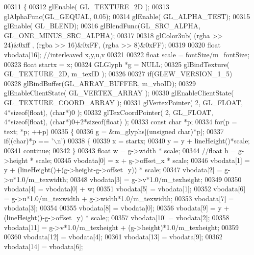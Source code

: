 \begin{DoxyCode}
00311 \{
00312     glEnable( GL_TEXTURE_2D );
00313     glAlphaFunc(GL_GEQUAL, 0.05);
00314     glEnable( GL_ALPHA_TEST);
00315     glEnable( GL_BLEND);
00316     glBlendFunc(GL_SRC_ALPHA, GL_ONE_MINUS_SRC_ALPHA);
00317 
00318     glColor3ub( (rgba >> 24)&0xff , (rgba >> 16)&0xFF, (rgba >> 8)&0xFF);
00319 
00320     \textcolor{keywordtype}{float} vbodata[16]; \textcolor{comment}{//interleaved x,y,u,v}
00321 
00322     \textcolor{keywordtype}{float} scale = fontSize/m_fontSize;
00323     \textcolor{keywordtype}{float} startx = x;
00324     GLGlyph *g = NULL;
00325     glBindTexture( GL_TEXTURE_2D, m_texID );
00326 
00327     \textcolor{keywordflow}{if}(GLEW_VERSION_1_5)
00328         glBindBuffer(GL_ARRAY_BUFFER, m_vboID);
00329     glEnableClientState( GL_VERTEX_ARRAY );
00330     glEnableClientState( GL_TEXTURE_COORD_ARRAY );
00331     glVertexPointer( 2, GL_FLOAT, 4*\textcolor{keyword}{sizeof}(\textcolor{keywordtype}{float}), (\textcolor{keywordtype}{char}*)0 );
00332     glTexCoordPointer( 2, GL_FLOAT, 4*\textcolor{keyword}{sizeof}(\textcolor{keywordtype}{float}), (\textcolor{keywordtype}{char}*)0+2*\textcolor{keyword}{sizeof}(\textcolor{keywordtype}{float}) );
00333     \textcolor{keyword}{const} \textcolor{keywordtype}{char} *p;
00334     \textcolor{keywordflow}{for}(p = text; *p; ++p)
00335     \{
00336         g = &m_glyphs[(\textcolor{keywordtype}{unsigned} char)*p];
00337         \textcolor{keywordflow}{if}((\textcolor{keywordtype}{char})*p == \textcolor{charliteral}{'\(\backslash\)n'})
00338         \{
00339             x = startx;
00340             y = y + lineHeight()*scale;
00341             \textcolor{keywordflow}{continue};
00342         \}
00343         \textcolor{keywordtype}{float} w = g->width * scale;
00344         \textcolor{comment}{//float h = g->height * scale;}
00345         vbodata[0] = x + g->offset_x * scale;
00346         vbodata[1] = y + (lineHeight()+(g->height-g->offset_y)) * scale;
00347         vbodata[2] = g->u*1.0/m_texwidth;
00348         vbodata[3] = g->v*1.0/m_texheight;
00349 
00350         vbodata[4] = vbodata[0] + w;
00351         vbodata[5] = vbodata[1];
00352         vbodata[6] = g->u*1.0/m_texwidth + g->width*1.0/m_texwidth;
00353         vbodata[7] = vbodata[3];
00354 
00355         vbodata[8] = vbodata[0];
00356         vbodata[9] = y + (lineHeight()-g->offset_y) * scale;;
00357         vbodata[10] = vbodata[2];
00358         vbodata[11] = g->v*1.0/m_texheight + (g->height)*1.0/m_texheight;
00359 
00360         vbodata[12] = vbodata[4];
00361         vbodata[13] = vbodata[9];
00362         vbodata[14] = vbodata[6];

\end{DoxyCode}
